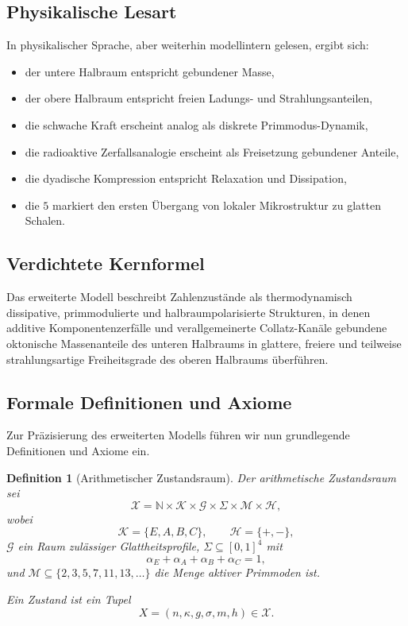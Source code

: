 \documentclass[11pt,a4paper]{article}
\newtheorem{definition}{Definition}
\theoremstyle{definition}
\begin{document}
\subsection{Physikalische Lesart}

In physikalischer Sprache, aber weiterhin modellintern gelesen, ergibt sich:
\begin{itemize}
	\item der untere Halbraum entspricht gebundener Masse,
	\item der obere Halbraum entspricht freien Ladungs- und Strahlungsanteilen,
	\item die schwache Kraft erscheint analog als diskrete Primmodus-Dynamik,
	\item die radioaktive Zerfallsanalogie erscheint als Freisetzung gebundener Anteile,
	\item die dyadische Kompression entspricht Relaxation und Dissipation,
	\item die $5$ markiert den ersten Übergang von lokaler Mikrostruktur zu glatten Schalen.
\end{itemize}

\subsection{Verdichtete Kernformel}

Das erweiterte Modell beschreibt Zahlenzustände als thermodynamisch dissipative, primmodulierte und halbraumpolarisierte Strukturen, in denen additive Komponentenzerfälle und verallgemeinerte Collatz-Kanäle gebundene oktonische Massenanteile des unteren Halbraums in glattere, freiere und teilweise strahlungsartige Freiheitsgrade des oberen Halbraums überführen.

\subsection{Formale Definitionen und Axiome}

Zur Präzisierung des erweiterten Modells führen wir nun grundlegende Definitionen und Axiome ein.

\begin{definition}[Arithmetischer Zustandsraum]
	Der arithmetische Zustandsraum sei
	\[
	\mathcal{X}
	=
	\mathbb{N}\times \mathcal{K}\times \mathcal{G}\times \Sigma\times \mathcal{M}\times \mathcal{H},
	\]
	wobei
	\[
	\mathcal{K}=\{E,A,B,C\},\qquad
	\mathcal{H}=\{+,-\},
	\]
	$\mathcal{G}$ ein Raum zulässiger Glattheitsprofile, $\Sigma\subseteq [0,1]^4$ mit
	\[
	\alpha_E+\alpha_A+\alpha_B+\alpha_C=1,
	\]
	und $\mathcal{M}\subseteq\{2,3,5,7,11,13,\dots\}$ die Menge aktiver Primmoden ist.
	
	Ein Zustand ist ein Tupel
	\[
	X=(n,\kappa,g,\sigma,m,h)\in \mathcal{X}.
	\]
\end{definition}
\end{document}
